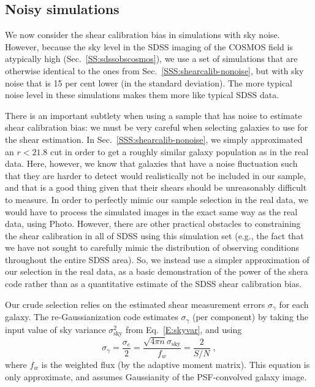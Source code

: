 \documentclass[twocolumn,useAMS,usenatbib]{mn2e}
\newcommand{\beq}{\begin{equation}}
\newcommand{\eeq}{\end{equation}}
\begin{document}
\subsection{Noisy simulations}\label{SSS:shearcalib-noisy}

We now consider the shear calibration bias in simulations with %
sky noise.  However, because the sky level in the SDSS
imaging of the COSMOS field is atypically high
(Sec.~\ref{SS:sdssobscosmos}), we use a set of simulations that are
otherwise identical to the ones from Sec.~\ref{SSS:shearcalib-nonoise}, but
with sky noise that is 15 per cent lower (in the standard deviation).  %
The more typical noise level in these simulations makes them more like typical SDSS data.

There is an important subtlety when using a sample that has noise to
estimate shear calibration bias: %
we must be very careful when
selecting galaxies to use for the shear estimation.  In Sec.~\ref{SSS:shearcalib-nonoise}, we simply
approximated an $r<21.8$ cut in order to get a roughly similar galaxy
population as in the real data.  Here, however, we know that galaxies
that have a noise fluctuation such that they are harder to detect
would realistically not be included in our sample, and that is a good
thing given that their shears should be unreasonably difficult to
measure.  In order to perfectly mimic our sample selection in the real
data, we would have to process the simulated images in the exact same
way as the real data, using {\sc Photo}.  However, there are other
practical obstacles to constraining the shear calibration in all of
SDSS using this simulation set (e.g., the fact that we have not sought
to carefully mimic the distribution of observing conditions throughout
the entire SDSS area).  So, we instead use a simpler
approximation of our selection in the real data, as a basic
demonstration of the power of the {\sc shera} code rather than as a
quantitative estimate of the SDSS shear calibration bias.%

Our crude selection relies on the estimated shear measurement errors $\sigma_\gamma$
for each galaxy.  The re-Gaussianization code estimates
$\sigma_\gamma$ (per component) by taking the input value of sky variance
$\sigma_\mathrm{sky}^2$ from
Eq.~\eqref{E:skyvar}, and using \citep{2002AJ....123..583B}
\beq
\sigma_\gamma = \frac{\sigma_e}{2} = \frac{\sqrt{4\pi n}\sigma_\mathrm{sky}}{f_w} = \frac{2}{S/N}\;,
\eeq 
where $f_w$ is the weighted flux (by the adaptive moment
matrix). This equation
is only approximate, and assumes Gaussianity of the PSF-convolved
galaxy image.
\end{document}

